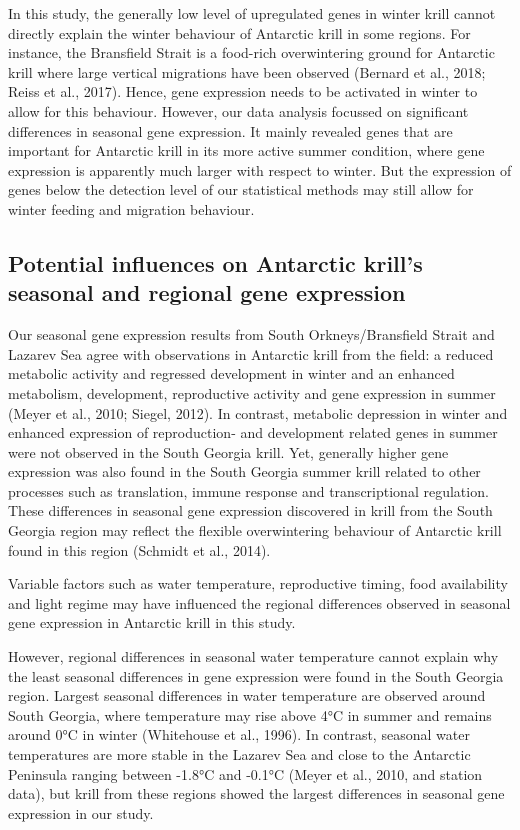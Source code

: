 In this study, the generally low level of upregulated genes in winter krill cannot directly explain the winter behaviour of Antarctic krill in some regions. For instance, the Bransfield Strait is a food-rich overwintering ground for Antarctic krill where large vertical migrations have been observed (Bernard et al., 2018; Reiss et al., 2017). Hence, gene expression needs to be activated in winter to allow for this behaviour. However, our data analysis focussed on significant differences in seasonal gene expression. It mainly revealed genes that are important for Antarctic krill in its more active summer condition, where gene expression is apparently much larger with respect to winter. But the expression of genes below the detection level of our statistical methods may still allow for winter feeding and migration behaviour.

\subsection*{Potential influences on Antarctic krill's seasonal and regional gene expression}

Our seasonal  gene expression results from South Orkneys/Bransfield Strait and Lazarev Sea agree with observations in Antarctic krill from the field: a reduced metabolic activity and regressed development in winter and an enhanced metabolism, development, reproductive activity and gene expression in summer (Meyer et al., 2010; Siegel, 2012). In contrast, metabolic depression in winter and enhanced expression of reproduction- and development related genes in summer were not observed in the South Georgia krill.  Yet, generally higher gene expression was also found in the South Georgia summer krill related to other processes such as translation, immune response and transcriptional regulation. These differences in seasonal gene expression discovered in krill from the South Georgia region may reflect the flexible overwintering behaviour of Antarctic krill found in this region (Schmidt et al., 2014).

Variable factors such as water temperature, reproductive timing, food availability and light regime may have influenced the regional differences observed in seasonal gene expression in Antarctic krill in this study.

However, regional differences in seasonal water temperature cannot explain why the least seasonal differences in gene expression were found in the South Georgia region. Largest seasonal differences in water temperature are observed around South Georgia, where temperature may rise above 4°C in summer and remains around 0°C in winter (Whitehouse et al., 1996). In contrast, seasonal water temperatures are more stable in the Lazarev Sea and close to the Antarctic Peninsula ranging between -1.8°C  and -0.1°C (Meyer et al., 2010, and station data), but krill from these regions showed the largest differences in seasonal gene expression in our study.

